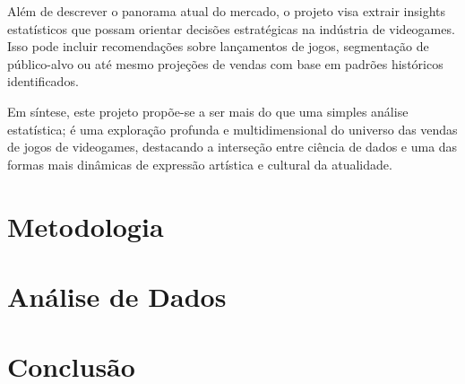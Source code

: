 \documentclass[draft]{agujournal2018}
\begin{document}
Além de descrever o panorama atual do mercado, o projeto visa extrair
insights estatísticos que possam orientar decisões estratégicas na
indústria de videogames. Isso pode incluir recomendações sobre
lançamentos de jogos, segmentação de público-alvo ou até mesmo projeções
de vendas com base em padrões históricos identificados.

Em síntese, este projeto propõe-se a ser mais do que uma simples análise
estatística; é uma exploração profunda e multidimensional do universo
das vendas de jogos de videogames, destacando a interseção entre ciência
de dados e uma das formas mais dinâmicas de expressão artística e
cultural da atualidade.

\section{Metodologia}

\section{Análise de Dados}

\section{Conclusão}


\end{document}
